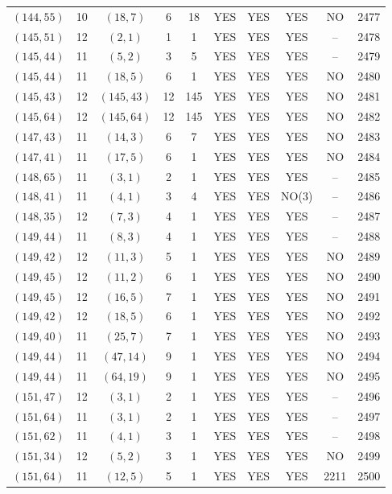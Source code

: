 \begin{longtable}{|c|c|c|c|c|c|c|c|c|c|}
$(144, 55)$ & 10 & $(18, 7)$ & 6 & 18 & YES & YES & YES & NO & 2477\\
$(145, 51)$ & 12 & $(2, 1)$ & 1 & 1 & YES & YES & YES & -- & 2478\\
$(145, 44)$ & 11 & $(5, 2)$ & 3 & 5 & YES & YES & YES & -- & 2479\\
$(145, 44)$ & 11 & $(18, 5)$ & 6 & 1 & YES & YES & YES & NO & 2480\\
$(145, 43)$ & 12 & $(145, 43)$ & 12 & 145 & YES & YES & YES & NO & 2481\\
$(145, 64)$ & 12 & $(145, 64)$ & 12 & 145 & YES & YES & YES & NO & 2482\\
$(147, 43)$ & 11 & $(14, 3)$ & 6 & 7 & YES & YES & YES & NO & 2483\\
$(147, 41)$ & 11 & $(17, 5)$ & 6 & 1 & YES & YES & YES & NO & 2484\\
$(148, 65)$ & 11 & $(3, 1)$ & 2 & 1 & YES & YES & YES & -- & 2485\\
$(148, 41)$ & 11 & $(4, 1)$ & 3 & 4 & YES & YES & NO(3) & -- & 2486\\
$(148, 35)$ & 12 & $(7, 3)$ & 4 & 1 & YES & YES & YES & -- & 2487\\
$(149, 44)$ & 11 & $(8, 3)$ & 4 & 1 & YES & YES & YES & -- & 2488\\
$(149, 42)$ & 12 & $(11, 3)$ & 5 & 1 & YES & YES & YES & NO & 2489\\
$(149, 45)$ & 12 & $(11, 2)$ & 6 & 1 & YES & YES & YES & NO & 2490\\
$(149, 45)$ & 12 & $(16, 5)$ & 7 & 1 & YES & YES & YES & NO & 2491\\
$(149, 42)$ & 12 & $(18, 5)$ & 6 & 1 & YES & YES & YES & NO & 2492\\
$(149, 40)$ & 11 & $(25, 7)$ & 7 & 1 & YES & YES & YES & NO & 2493\\
$(149, 44)$ & 11 & $(47, 14)$ & 9 & 1 & YES & YES & YES & NO & 2494\\
$(149, 44)$ & 11 & $(64, 19)$ & 9 & 1 & YES & YES & YES & NO & 2495\\
$(151, 47)$ & 12 & $(3, 1)$ & 2 & 1 & YES & YES & YES & -- & 2496\\
$(151, 64)$ & 11 & $(3, 1)$ & 2 & 1 & YES & YES & YES & -- & 2497\\
$(151, 62)$ & 11 & $(4, 1)$ & 3 & 1 & YES & YES & YES & -- & 2498\\
$(151, 34)$ & 12 & $(5, 2)$ & 3 & 1 & YES & YES & YES & NO & 2499\\
$(151, 64)$ & 11 & $(12, 5)$ & 5 & 1 & YES & YES & YES & 2211 & 2500\\

\end{longtable}
